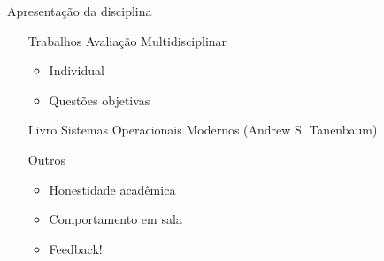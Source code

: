 \documentclass{beamer}
\begin{document}
\begin{frame}{Apresentação da disciplina}
   	\begin{itemize}
   		\item[Trabalhos] Avaliação Multidisciplinar
   		\begin{itemize}
   			\item Individual
   			\item Questões objetivas
   		\end{itemize}
   		\item[Livro] Sistemas Operacionais Modernos (Andrew S. Tanenbaum)
   		\item[Outros]
   		\begin{itemize}
   			\item Honestidade acadêmica
   			\item Comportamento em sala
   			\item Feedback!
   		\end{itemize}
   	\end{itemize}
\end{frame}
\end{document}
